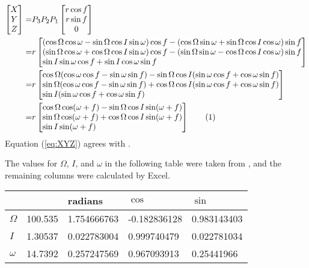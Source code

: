 \documentclass[]{article}
\newcommand\numberthis{\addtocounter{equation}{1}\tag{\theequation}}
\begin{document}
\begin{align*}
\begin{bmatrix*}[c]
X\\
Y\\
Z
\end{bmatrix*}
=&P_3 P_2 P_1\begin{bmatrix*}[c]
r \cos f\\
r \sin f\\
0
\end{bmatrix*}\\
=&r \begin{bmatrix*}[l]
(\cos \Omega \cos \omega - \sin \Omega \cos I \sin \omega) \cos f -(\cos \Omega \sin \omega + \sin \Omega \cos I \cos \omega) \sin f\\
(\sin \Omega \cos \omega + \cos \Omega \cos I \sin \omega) \cos f - (\sin \Omega \sin \omega - \cos \Omega \cos I \cos \omega) \sin f\\
\sin I \sin \omega \cos f + \sin I \cos \omega \sin f
\end{bmatrix*}\\
=&r \begin{bmatrix*}[l]
\cos \Omega (\cos \omega \cos f-\sin \omega \sin f) -\sin\Omega \cos I (\sin \omega \cos f + \cos \omega \sin f)\\
\sin \Omega (\cos \omega \cos f - \sin \omega \sin f) + \cos\Omega \cos I (\sin \omega \cos f + \cos \omega \sin f) \\
\sin I (\sin \omega \cos f + \cos \omega \sin f)
\end{bmatrix*}\\
=&r \begin{bmatrix*}[l]
\cos \Omega \cos (\omega + f) - \sin \Omega \cos I \sin(\omega + f)\\
\sin \Omega \cos (\omega + f) + \cos \Omega \cos I \sin (\omega + f)\\
\sin I \sin (\omega + f)
\end{bmatrix*} \numberthis \label{eq:XYZ}
\end{align*}
Equation (\ref{eq:XYZ}) agrees with \cite[(2.122)]{ssd}.

The values for $\Omega$, $I$, and $\omega$ in the following table were taken from \cite[Page 51]{ssd}, and the remaining columns were calculated by Excel.
\begin{center}
	\begin{tabular}{|l|l|l|l|l|}
		\hline
		&&	radians&$\cos$&$\sin$\\ \hline
		$\Omega$&100.535\degree	&1.754666763&	-0.182836128&	0.983143403\\ \hline
		$I$&1.30537\degree&	0.022783004&	0.999740479&	0.022781034\\ \hline
		$\omega$&14.7392\degree&	0.257247569&	0.967093913&	0.25441966\\ \hline
	\end{tabular}
\end{center}
\end{document}
